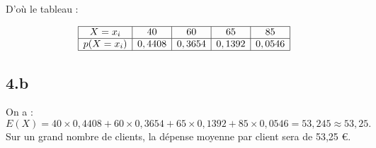 \documentclass[10pt]{article}
\begin{document}
	D'où le tableau :
	
	\[
	\begin{array}{|c|c|c|c|c|}
		\hline
		X = x_i & 40 & 60 & 65 & 85 \\
		\hline
		p(X = x_i) & 0,4408 & 0,3654 & 0,1392 & 0,0546 \\
		\hline
	\end{array}
	\]
	
	\subsection*{4.b}
	On a :
	\[
	E(X) = 40 \times 0,4408 + 60 \times 0,3654 + 65 \times 0,1392 + 85 \times 0,0546 = 53,245 \approx 53,25.
	\]
	Sur un grand nombre de clients, la dépense moyenne par client sera de 53,25 €.
\end{document}
